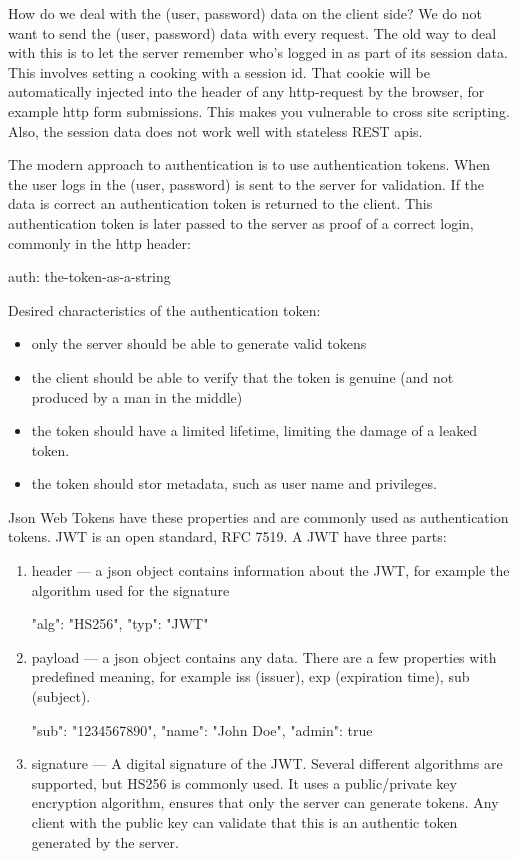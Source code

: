 How do we deal with the (user, password) data on the client side? We do not want to send the (user, password) data with every request. The old way to deal with this is to let the server remember who's logged in as part of its session data. This involves setting a cooking with a session id. That cookie will be automatically injected into the header of any http-request by the browser, for example http form submissions. This makes you vulnerable to cross site scripting. Also, the session data does not work well with stateless REST apis. 

The modern approach to authentication is to use authentication tokens. When the user logs in the (user, password) is sent to the server for validation. If the data is correct an authentication token is returned to the client. This authentication token is later passed to the server as proof of a correct login, commonly in the http header:
\begin{Code}
auth: the-token-as-a-string
\end{Code}
Desired characteristics of the authentication token:
\begin{itemize}
\item only the server should be able to generate valid tokens
\item the client should be able to verify that the token is genuine (and not produced by a man in the middle)
\item the token should have a limited lifetime, limiting the damage of a leaked token.
\item the token should stor metadata, such as user name and privileges.
\end{itemize}
Json Web Tokens have these properties and are commonly used as authentication tokens. JWT is an open standard, RFC 7519. A JWT have three parts:
\begin{enumerate}
\item header --- a json object contains information about the JWT, for example the algorithm used for the signature
\begin{Code}
{
  "alg": "HS256",
  "typ": "JWT"
}
\end{Code}
\item payload --- a json object contains any data. There are a few properties with predefined meaning, for example iss (issuer), exp (expiration time), sub (subject).
\begin{Code}
{
  "sub": "1234567890",
  "name": "John Doe",
  "admin": true
}
\end{Code}
\item signature --- A digital signature of the JWT. Several different algorithms are supported, but HS256 is commonly used. It uses a public/private key encryption algorithm, ensures that only the server can generate tokens. Any client with the public key can validate that this is an authentic token generated by the server.
\end{enumerate}
